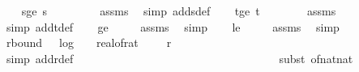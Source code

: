 \begin{isabellebody}
\ \ \isamarkupfalse%
\ s{\isacharunderscore}{\kern0pt}ge{\isacharunderscore}{\kern0pt}{}{\isacharcolon}{\kern0pt}\ {\isachardoublequoteopen}s\ {\isachargreater}{\kern0pt}\ {}{\isachardoublequoteclose}\ \isanewline
\ \ \ \ \isamarkupfalse%
\ assms{\isacharparenleft}{\kern0pt}{}{\isacharparenright}{\kern0pt}\ \isamarkupfalse%
\ {\isacharparenleft}{\kern0pt}simp\ add{\isacharcolon}{\kern0pt}s{\isacharunderscore}{\kern0pt}def{\isacharparenright}{\kern0pt}\isanewline
\isanewline
\ \ \isamarkupfalse%
\ t{\isacharunderscore}{\kern0pt}ge{\isacharunderscore}{\kern0pt}{}{\isacharcolon}{\kern0pt}\ {\isachardoublequoteopen}t\ {\isachargreater}{\kern0pt}\ {}{\isachardoublequoteclose}\isanewline
\ \ \ \ \isamarkupfalse%
\ assms\ \isamarkupfalse%
\ {\isacharparenleft}{\kern0pt}simp\ add{\isacharcolon}{\kern0pt}t{\isacharunderscore}{\kern0pt}def{\isacharparenright}{\kern0pt}\isanewline
\isanewline
\ \ \isamarkupfalse%
\ {\isasymdelta}{\isacharunderscore}{\kern0pt}ge{\isacharunderscore}{\kern0pt}{}{\isacharcolon}{\kern0pt}\ {\isachardoublequoteopen}{\isasymdelta}\ {\isachargreater}{\kern0pt}\ {}{\isachardoublequoteclose}\ \isamarkupfalse%
\ assms\ \isamarkupfalse%
\ simp\isanewline
\ \ \isamarkupfalse%
\ {\isasymdelta}{\isacharunderscore}{\kern0pt}le{\isacharunderscore}{\kern0pt}{}{\isacharcolon}{\kern0pt}\ {\isachardoublequoteopen}{\isasymdelta}\ {\isacharless}{\kern0pt}\ {}{\isachardoublequoteclose}\ \isamarkupfalse%
\ assms\ \isamarkupfalse%
\ simp\isanewline
\isanewline
\ \ \isamarkupfalse%
\ r{\isacharunderscore}{\kern0pt}bound{\isacharcolon}{\kern0pt}\ {\isachardoublequoteopen}{}\ {\isacharasterisk}{\kern0pt}\ log\ {}\ {\isacharparenleft}{\kern0pt}{}\ {\isacharslash}{\kern0pt}\ real{\isacharunderscore}{\kern0pt}of{\isacharunderscore}{\kern0pt}rat\ {\isasymdelta}{\isacharparenright}{\kern0pt}\ {\isacharplus}{\kern0pt}\ {}{}\ {\isasymle}\ r{\isachardoublequoteclose}\isanewline
\ \ \ \ \isamarkupfalse%
\ {\isacharparenleft}{\kern0pt}simp\ add{\isacharcolon}{\kern0pt}r{\isacharunderscore}{\kern0pt}def{\isacharparenright}{\kern0pt}\ \ \ \ \ \ \ \ \ \ \ \ \ \ \ \ \ \ \ \ \ \ \ \ \ \ \ \ \ \ \isanewline
\ \ \ \ \isamarkupfalse%
\ {\isacharparenleft}{\kern0pt}subst\ of{\isacharunderscore}{\kern0pt}nat{\isacharunderscore}{\kern0pt}nat{\isacharparenright}{\kern0pt}\isanewline

\end{isabellebody}

